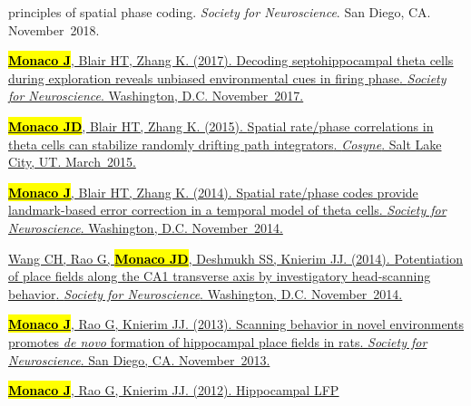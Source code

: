 \documentclass[10pt]{article}
\newcommand{\itemtitle}[1]{{\color{hopkinsblue}\ul{#1}}}
\newcommand{\joehl}[1]{\hl{\textbf{#1}}}
\begin{document}
\begin{description}
{{      principles of spatial phase coding}. \emph{Society for Neuroscience}.
    San Diego, CA. November~2018.}
  \item[\quad]
    \href{http://www.abstractsonline.com/pp8/#!/4376/presentation/6085}
    {\joehl{Monaco J}, Blair HT, Zhang K. (2017). \itemtitle{Decoding
        septohippocampal theta cells during exploration reveals unbiased
      environmental cues in firing phase}. \emph{Society for Neuroscience}.
    Washington, D.C. November~2017.}
  \item[\quad]
    \href{http://jdmonaco.com/files/monaco-paper-cosyne15.pdf}
    {\joehl{Monaco JD}, Blair HT, Zhang K. (2015). \itemtitle{Spatial
        rate/phase correlations in theta cells can stabilize randomly drifting path
    integrators}. \emph{Cosyne}. Salt Lake City, UT. March~2015.}
  \item[\quad]
    \href{http://www.abstractsonline.com/Plan/ViewAbstract.aspx?sKey=973d2662-ba7a-4ad2-aff9-fe0d4b77c262&cKey=9917ffaf-9e31-4213-acb9-4aab498ab4cd&mKey=54c85d94-6d69-4b09-afaa-502c0e680ca7}
    {\joehl{Monaco J}, Blair HT, Zhang K. (2014). \itemtitle{Spatial rate/phase
        codes provide landmark-based error correction in a temporal model of theta
    cells}. \emph{Society for Neuroscience}. Washington, D.C.  November~2014.}
  \item[\quad]
    \href{http://www.abstractsonline.com/Plan/ViewAbstract.aspx?sKey=bfb59866-8deb-44a6-9515-a7aab630507b&cKey=d201b3aa-7725-452e-b0dd-c41d204b5b54&mKey=54c85d94-6d69-4b09-afaa-502c0e680ca7}
    {Wang CH, Rao G, \joehl{Monaco JD}, Deshmukh SS, Knierim JJ. (2014).
    \itemtitle{Potentiation of place fields along the CA1 transverse axis by
      investigatory head-scanning behavior}. \emph{Society for Neuroscience}. 
    Washington, D.C. November~2014.}
  \item[\quad]
    \href{http://www.abstractsonline.com/Plan/ViewAbstract.aspx?sKey=32eccac1-4e1d-4e81-bf5c-f39bcb605757&cKey=4710dece-cc8e-4b48-8764-49ea174b91ef&mKey=8d2a5bec-4825-4cd6-9439-b42bb151d1cf}
    {\joehl{Monaco J}, Rao G, Knierim JJ. (2013). \itemtitle{Scanning behavior
        in novel environments promotes \emph{de novo} formation of hippocampal place
    fields in rats}. \emph{Society for Neuroscience}. San Diego, CA. November~2013.}
  \item[\quad]
    \href{http://www.abstractsonline.com/Plan/ViewAbstract.aspx?sKey=f5b9fa94-7d15-48c7-9d67-b89cd2883025&cKey=a53349ca-41b1-4664-b022-85d0d1fe59b8&mKey=70007181-01C9-4DE9-A0A2-EEBFA14CD9F1}
    {\joehl{Monaco J}, Rao G, Knierim JJ. (2012). \itemtitle{Hippocampal LFP
}}
\end{description}
\end{document}
